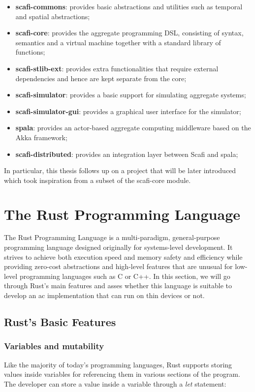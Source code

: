 \begin{itemize}
    \item \textbf{scafi-commons}: provides basic abstractions and utilities such as temporal and spatial abstractions;
    \item \textbf{scafi-core}: provides the aggregate programming DSL, consisting of syntax, semantics and a virtual machine together with a standard library of functions;
    \item \textbf{scafi-stlib-ext}: provides extra functionalities that require external dependencies and hence are kept separate from the core;
    \item \textbf{scafi-simulator}: provides a basic support for simulating aggregate systems;
    \item \textbf{scafi-simulator-gui}: provides a graphical user interface for the simulator;
    \item \textbf{spala}: provides an actor-based aggregate computing middleware based on the Akka framework;
    \item \textbf{scafi-distributed}: provides an integration layer between Scafi and spala;
\end{itemize}

In particular, this thesis follows up on a project that will be later introduced which took inspiration from a subset of the scafi-core module.

\section{The Rust Programming Language}
The Rust Programming Language\cite{002} is a multi-paradigm, general-purpose programming language designed originally for systems-level development. It strives to achieve both execution
speed and memory safety and efficiency while providing zero-cost abstractions and high-level features that are unusual for low-level programming languages such as C or C++.
In this section, we will go through Rust's main features and asses whether this language is suitable to develop an \acs{ac} implementation that can run on thin devices or not.

\subsection{Rust's Basic Features}
\subsubsection{Variables and mutability}
Like the majority of today's programming languages, Rust supports storing values inside variables for referencing them in various sections of the program. \\
The developer can store a value inside a variable through a \textit{let} statement:

